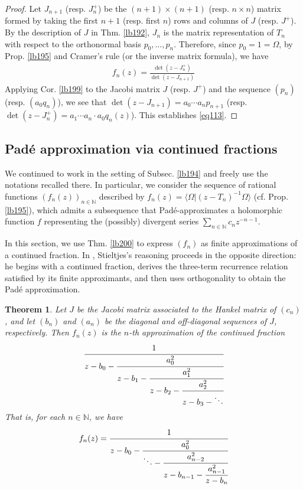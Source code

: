 \documentclass[12pt,b5paper,notitlepage]{article}
\theoremstyle{definition}
\theoremstyle{plain}
\newtheorem{thm}[df]{Theorem}
\newcommand{\bk}[1]{\langle {#1}\rangle}
\newcommand{\Nbb}{\mathbb N}
\numberwithin{equation}{section}
\begin{document}
\begin{proof}
Let $J_{n+1}$ (resp. $J^+_n$) be the $(n+1)\times (n+1)$ (resp. $n\times n$)  matrix formed by taking the first $n+1$ (resp. first $n$) rows and columns of $J$ (resp. $J^+$). By the description of $J$ in Thm. \ref{lb192}, $J_n$ is the matrix representation of $T_n$ with respect to the orthonormal basis $p_0,\dots,p_n$. Therefore, since $p_0=1=\Omega$, by Prop. \ref{lb195} and Cramer's rule (or the inverse matrix formula), we have
\begin{align}
f_n(z)=\frac{\det(z-J^+_n)}{\det(z-J_{n+1})}
\end{align}
Applying Cor. \ref{lb199} to the Jacobi matrix $J$ (resp. $J^+$) and the sequence $(p_n)$ (resp. $(a_0q_n)$), we see that $\det(z-J_{n+1})=a_0\cdots a_np_{n+1}$ (resp. $\det(z-J^+_n)=a_1\cdots a_n\cdot a_0 q_n(z)$). This establishes \eqref{eq113}.
\end{proof}





\subsection{Pad\'e approximation via continued fractions}\label{lb453}



We continued to work in the setting of Subsec. \ref{lb194} and freely use the notations recalled there. In particular, we consider the sequence of rational functions $(f_n(z))_{n\in\Nbb}$ described by $f_n(z)=\bk{\Omega|(z-T_n)^{-1}\Omega}$ (cf. Prop. \ref{lb195}), which admits a subsequence that Pad\'e-approximates a holomorphic function $f$ representing the (possibly) divergent series $\sum_{n\in\Nbb}c_nz^{-n-1}$. 

In this section, we use Thm. \ref{lb200} to express $(f_n)$ as finite approximations of a continued fraction. In \cite{Sti94}, Stieltjes's reasoning proceeds in the opposite direction: he begins with a continued fraction, derives the three-term recurrence relation satisfied by its finite approximants, and then uses orthogonality to obtain the Pad\'e approximation.

\begin{thm}\label{lb454}
Let $J$ be the Jacobi matrix associated to the Hankel matrix of $(c_n)$, and let $(b_n)$ and $(a_n)$ be the diagonal and off-diagonal sequences of $J$, respectively. Then $f_n(z)$ is the $n$-th approximation of the continued fraction
\begin{align*}
\cfrac{1}{z-b_0-\cfrac{a_0^2}{z-b_1-\cfrac{a_1^2}{z-b_2-\cfrac{a_2^2}{z-b_3-\ddots}  } } }
\end{align*}
That is, for each $n\in\Nbb$, we have
\begin{align}\label{eq115}
f_n(z)=\cfrac{1}{z-b_0-\cfrac{a_0^2}{\ddots-\cfrac{a_{n-2}^2}{z-b_{n-1}-\cfrac{a_{n-1}^2}{z-b_n} } } }
\end{align}
\end{thm}
\end{document}
